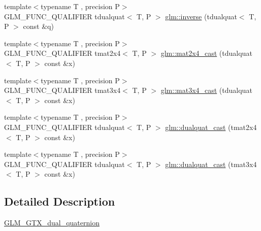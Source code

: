\begin{DoxyCompactItemize}
\item 
{\footnotesize template$<$typename T , precision P$>$ }\\G\+L\+M\+\_\+\+F\+U\+N\+C\+\_\+\+Q\+U\+A\+L\+I\+F\+I\+ER tdualquat$<$ T, P $>$ \hyperlink{group__gtx__dual__quaternion_ga2149d3cb8af04d9530de0cd16aa1aab2}{glm\+::inverse} (tdualquat$<$ T, P $>$ const \&q)
\item 
{\footnotesize template$<$typename T , precision P$>$ }\\G\+L\+M\+\_\+\+F\+U\+N\+C\+\_\+\+Q\+U\+A\+L\+I\+F\+I\+ER tmat2x4$<$ T, P $>$ \hyperlink{group__gtx__dual__quaternion_ga2d124748183e12db8288eeaca350298e}{glm\+::mat2x4\+\_\+cast} (tdualquat$<$ T, P $>$ const \&x)
\item 
{\footnotesize template$<$typename T , precision P$>$ }\\G\+L\+M\+\_\+\+F\+U\+N\+C\+\_\+\+Q\+U\+A\+L\+I\+F\+I\+ER tmat3x4$<$ T, P $>$ \hyperlink{group__gtx__dual__quaternion_ga576745d979e3c079a64152490c816954}{glm\+::mat3x4\+\_\+cast} (tdualquat$<$ T, P $>$ const \&x)
\item 
{\footnotesize template$<$typename T , precision P$>$ }\\G\+L\+M\+\_\+\+F\+U\+N\+C\+\_\+\+Q\+U\+A\+L\+I\+F\+I\+ER tdualquat$<$ T, P $>$ \hyperlink{group__gtx__dual__quaternion_gada9799afe2b62394dc498534beb5bc78}{glm\+::dualquat\+\_\+cast} (tmat2x4$<$ T, P $>$ const \&x)
\item 
{\footnotesize template$<$typename T , precision P$>$ }\\G\+L\+M\+\_\+\+F\+U\+N\+C\+\_\+\+Q\+U\+A\+L\+I\+F\+I\+ER tdualquat$<$ T, P $>$ \hyperlink{group__gtx__dual__quaternion_ga20eb5758beb73cc6dbc2d9104f03ec20}{glm\+::dualquat\+\_\+cast} (tmat3x4$<$ T, P $>$ const \&x)
\end{DoxyCompactItemize}


\subsection{Detailed Description}
\hyperlink{group__gtx__dual__quaternion}{G\+L\+M\+\_\+\+G\+T\+X\+\_\+dual\+\_\+quaternion} 